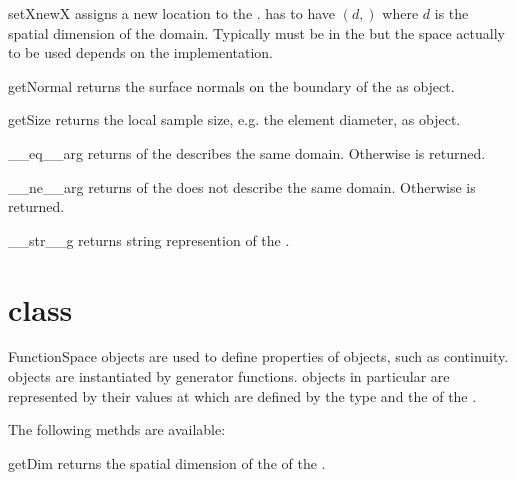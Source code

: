 \begin{methoddesc}[Domain]{setX}{newX}
assigns a new location to the \Domain.  has to have \Shape $(d,)$
where $d$ is the spatial dimension of the domain. Typically  must be
in the \ContinuousFunction but the space actually to be used depends on the \Domain implementation.
\end{methoddesc}

\begin{methoddesc}[Domain]{getNormal}{}
returns the surface normals on the boundary of the \Domain as \Data object.
\end{methoddesc}

\begin{methoddesc}[Domain]{getSize}{}
returns the local sample size, e.g. the element diameter, as \Data object.
\end{methoddesc}

\begin{methoddesc}[Domain]{__eq__}{arg}
returns \True of the \Domain {} describes the same domain. Otherwise
\False is returned.
\end{methoddesc}

\begin{methoddesc}[Domain]{__ne__}{arg}
returns \True of the \Domain {} does not describe the same domain. 
Otherwise \False is returned.
\end{methoddesc}

\begin{methoddesc}[Domain]{__str__}{g}
returns string represention of the \Domain.
\end{methoddesc}

\section{\Domain class}
\begin{classdesc}{FunctionSpace}{}
\FunctionSpace objects are used to define properties of \Data objects, such as continuity. \FunctionSpace objects
are instantiated by generator functions. \Data objects in particular \FunctionSpace are
represented by their values at \DataSamplePoints which are defined by the type and the \Domain of the
\FunctionSpace.
\end{classdesc}
The following methds are available:
\begin{methoddesc}[FunctionSpace]{getDim}{}
returns the spatial dimension of the \Domain of the \FunctionSpace.
\end{methoddesc}


